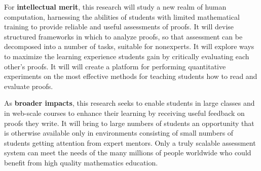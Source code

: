 \documentclass[12pt]{article}
\begin{document}
For {\bf intellectual merit}, this research will study a new realm of
human computation, harnessing the abilities of students with limited
mathematical training to provide reliable and useful assessments of
proofs.  It will devise structured frameworks in which to analyze
proofs, so that assessment can be decomposed into a number of tasks,
suitable for nonexperts.
It will explore ways to maximize the learning experience
students gain by critically evaluating each other's proofs.  It will
will create a platform for performing quantitative experiments on the
most effective methods for teaching students how to read and evaluate
proofs. 

As {\bf broader impacts}, this research seeks to enable students in
large classes and in web-scale courses to enhance their learning by
receiving useful feedback on proofs they write.  It will bring to
large numbers of students an opportunity that is otherwise available
only in environments consisting of small numbers of students getting
attention from expert mentors.  Only a truly scalable assessment
system can meet the needs of the many millions of people worldwide who
could benefit from high quality mathematics education.
\end{document}
